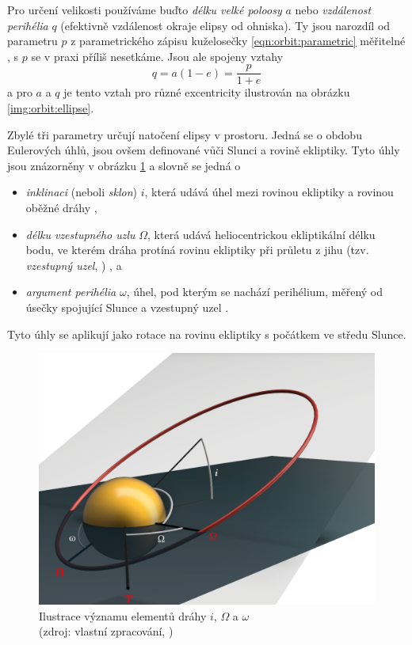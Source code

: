 Pro určení velikosti používáme buďto \textit{délku velké poloosy} $a$ nebo \textit{vzdálenost perihélia} $q$ (efektivně vzdálenost okraje elipsy od ohniska). Ty jsou narozdíl od parametru $p$ z parametrického zápisu kuželosečky \eqref{eqn:orbit:parametric} měřitelné \cite{dsh}, s $p$ se v praxi příliš nesetkáme. Jsou ale spojeny vztahy
$$
    q=a(1-e)=\frac{p}{1+e}
$$
a pro $a$ a $q$ je tento vztah pro různé excentricity ilustrován na obrázku \ref{img:orbit:ellipse}.

\medskip

Zbylé tři parametry určují natočení elipsy v prostoru. Jedná se o obdobu Eulerových úhlů, jsou ovšem definované vůči Slunci a rovině ekliptiky. Tyto úhly jsou znázorněny v obrázku \ref{img:orbit:elements} a slovně se jedná o
\begin{itemize}
    \item \textit{inklinaci} (neboli \textit{sklon}) $i$, která udává úhel mezi rovinou ekliptiky a rovinou oběžné dráhy \cite{astro},
    \item \textit{délku vzestupného uzlu} $\Omega$, která udává heliocentrickou ekliptikální délku bodu, ve kterém dráha protíná rovinu ekliptiky při průletu z jihu (tzv. \textit{vzestupný uzel}, \NorthNode) \cite{astro}, a
    \item \textit{argument perihélia} $\omega$, úhel, pod kterým se nachází perihélium, měřený od úsečky spojující Slunce a vzestupný uzel \cite{astro}.
\end{itemize}
Tyto úhly se aplikují jako rotace na rovinu ekliptiky s počátkem ve středu Slunce.

\begin{figure}[ht]
    \centering
    \includegraphics[width=0.8\linewidth]{img/orbital-elements/orbit-elements-marked.png}
    \caption[Ilustrace významu elementů dráhy $i$, $\Omega$ a $\omega$]{
        Ilustrace významu elementů dráhy $i$, $\Omega$ a $\omega$\\
        {\small (zdroj: vlastní zpracování, \cite{astro})}
    }
    \label{img:orbit:elements}
\end{figure}

